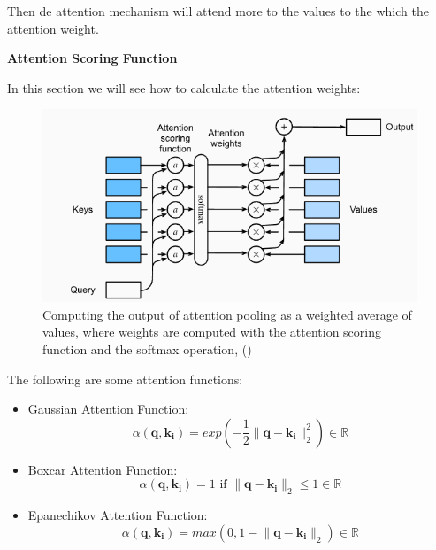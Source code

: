 Then de attention mechanism will attend more to the values to the which the attention weight.


\newpage


\textbf{Attention Scoring Function}

In this section we will see how to calculate the attention weights:

\begin{figure}[h!]
    \centering%
    \includegraphics[width=\linewidth]{Figures/background/attention_pooling_softmax.png}
    \caption{Computing the output of attention pooling as a weighted average of values, where weights are computed with the attention scoring function 
 and the softmax operation, (\cite{goodfellow2016dive})}
    \label{fig:attention}
\end{figure}



The following are some attention functions:

\begin{itemize}
    \item Gaussian Attention Function:
    \begin{equation}  
    \alpha (\mathbf{q},\mathbf{k_{i}})=exp(-\frac{1}{2}\lVert \mathbf{q}-\mathbf{k_{i}} \rVert_2^{2}) \in \mathbb{R}
    \end{equation}
    
    \item Boxcar Attention Function:
    \begin{equation}
    \alpha (\mathbf{q},\mathbf{k_{i}})=1 \text{ if } \lVert \mathbf{q}-\mathbf{k_{i}} \rVert_2 \leq 1 \in \mathbb{R}
    \end{equation}

    
    \item Epanechikov Attention Function:
    \begin{equation}
    \alpha (\mathbf{q},\mathbf{k_{i}})=max(0,1-\lVert \mathbf{q}-\mathbf{k_{i}} \rVert_2) \in \mathbb{R}
    \end{equation}
\end{itemize}

